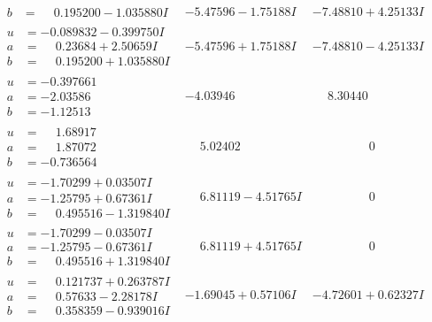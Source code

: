 \documentclass[1p]{elsarticle_modified}
\theoremstyle{definition}
\begin{document}
$$\begin{array}{c|c|c}
\begin{aligned}
b &= \phantom{-}0.195200 - 1.035880 I\end{aligned}
 & -5.47596 - 1.75188 I & -7.48810 + 4.25133 I \\ \hline\begin{aligned}
u &= -0.089832 - 0.399750 I \\
a &= \phantom{-}0.23684 + 2.50659 I \\
b &= \phantom{-}0.195200 + 1.035880 I\end{aligned}
 & -5.47596 + 1.75188 I & -7.48810 - 4.25133 I \\ \hline\begin{aligned}
u &= -0.397661\phantom{ +0.000000I} \\
a &= -2.03586\phantom{ +0.000000I} \\
b &= -1.12513\phantom{ +0.000000I}\end{aligned}
 & -4.03946\phantom{ +0.000000I} & \phantom{-}8.30440\phantom{ +0.000000I} \\ \hline\begin{aligned}
u &= \phantom{-}1.68917\phantom{ +0.000000I} \\
a &= \phantom{-}1.87072\phantom{ +0.000000I} \\
b &= -0.736564\phantom{ +0.000000I}\end{aligned}
 & \phantom{-}5.02402\phantom{ +0.000000I} & \phantom{-0.000000 } 0 \\ \hline\begin{aligned}
u &= -1.70299 + 0.03507 I \\
a &= -1.25795 + 0.67361 I \\
b &= \phantom{-}0.495516 - 1.319840 I\end{aligned}
 & \phantom{-}6.81119 - 4.51765 I & \phantom{-0.000000 } 0 \\ \hline\begin{aligned}
u &= -1.70299 - 0.03507 I \\
a &= -1.25795 - 0.67361 I \\
b &= \phantom{-}0.495516 + 1.319840 I\end{aligned}
 & \phantom{-}6.81119 + 4.51765 I & \phantom{-0.000000 } 0 \\ \hline\begin{aligned}
u &= \phantom{-}0.121737 + 0.263787 I \\
a &= \phantom{-}0.57633 - 2.28178 I \\
b &= \phantom{-}0.358359 - 0.939016 I\end{aligned}
 & -1.69045 + 0.57106 I & -4.72601 + 0.62327 I \\ \hline\begin{aligned}

\end{aligned}
\end{array}$$
\end{document}
